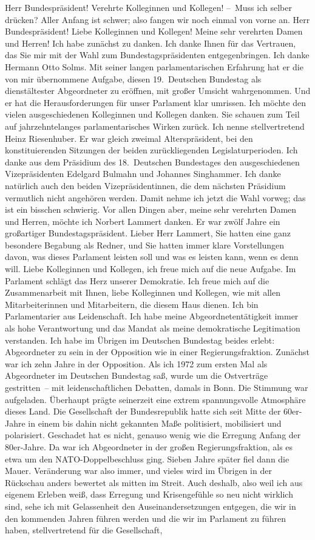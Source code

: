 \documentclass[a4paper,11pt]{article}
\begin{document}
Herr Bundespräsident! Verehrte Kolleginnen und Kollegen! – Muss ich selber drücken? Aller Anfang ist schwer; also fangen wir noch einmal von vorne an. Herr Bundespräsident! Liebe Kolleginnen und Kollegen! Meine sehr verehrten Damen und Herren! Ich habe zunächst zu danken. Ich danke Ihnen für das Vertrauen, das Sie mir mit der Wahl zum Bundestagspräsidenten entgegenbringen. Ich danke Hermann Otto Solms. Mit seiner langen parlamentarischen Erfahrung hat er die von mir übernommene Aufgabe, diesen 19. Deutschen Bundestag als dienstältester Abgeordneter zu eröffnen, mit großer Umsicht wahrgenommen. Und er hat die Herausforderungen für unser Parlament klar umrissen. Ich möchte den vielen ausgeschiedenen Kolleginnen und Kollegen danken. Sie schauen zum Teil auf jahrzehntelanges parlamentarisches Wirken zurück. Ich nenne stellvertretend Heinz Riesenhuber. Er war gleich zweimal Alterspräsident, bei den konstituierenden Sitzungen der beiden zurückliegenden Legislaturperioden. Ich danke aus dem Präsidium des 18. Deutschen Bundestages den ausgeschiedenen Vizepräsidenten Edelgard Bulmahn und Johannes Singhammer. Ich danke natürlich auch den beiden Vizepräsidentinnen, die dem nächsten Präsidium vermutlich nicht angehören werden. Damit nehme ich jetzt die Wahl vorweg; das ist ein bisschen schwierig. Vor allen Dingen aber, meine sehr verehrten Damen und Herren, möchte ich Norbert Lammert danken. Er war zwölf Jahre ein großartiger Bundestagspräsident. Lieber Herr Lammert, Sie hatten eine ganz besondere Begabung als Redner, und Sie hatten immer klare Vorstellungen davon, was dieses Parlament leisten soll und was es leisten kann, wenn es denn will. Liebe Kolleginnen und Kollegen, ich freue mich auf die neue Aufgabe. Im Parlament schlägt das Herz unserer Demokratie. Ich freue mich auf die Zusammenarbeit mit Ihnen, liebe Kolleginnen und Kollegen, wie mit allen Mitarbeiterinnen und Mitarbeitern, die diesem Haus dienen. Ich bin Parlamentarier aus Leidenschaft. Ich habe meine Abgeordnetentätigkeit immer als hohe Verantwortung und das Mandat als meine demokratische Legitimation verstanden. Ich habe im Übrigen im Deutschen Bundestag beides erlebt: Abgeordneter zu sein in der Opposition wie in einer Regierungsfraktion. Zunächst war ich zehn Jahre in der Opposition. Als ich 1972 zum ersten Mal als Abgeordneter im Deutschen Bundestag saß, wurde um die Ostverträge gestritten – mit leidenschaftlichen Debatten, damals in Bonn. Die Stimmung war aufgeladen. Überhaupt prägte seinerzeit eine extrem spannungsvolle Atmosphäre dieses Land. Die Gesellschaft der Bundesrepublik hatte sich seit Mitte der 60er-Jahre in einem bis dahin nicht gekannten Maße politisiert, mobilisiert und polarisiert. Geschadet hat es nicht, genauso wenig wie die Erregung Anfang der 80er-Jahre. Da war ich Abgeordneter in der großen Regierungsfraktion, als es etwa um den NATO-Doppelbeschluss ging. Sieben Jahre später fiel dann die Mauer. Veränderung war also immer, und vieles wird im Übrigen in der Rückschau anders bewertet als mitten im Streit. Auch deshalb, also weil ich aus eigenem Erleben weiß, dass Erregung und Krisengefühle so neu nicht wirklich sind, sehe ich mit Gelassenheit den Auseinandersetzungen entgegen, die wir in den kommenden Jahren führen werden und die wir im Parlament zu führen haben, stellvertretend für die Gesellschaft, 
\end{document}
